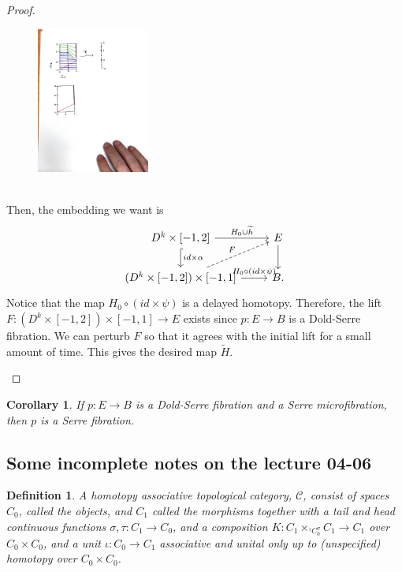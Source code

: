 \documentclass{article}
\newtheorem{corollary}[theorem]{Corollary}
\newtheorem{definition}[theorem]{Definition}
\newtheorem{proposed work}[theorem]{Proposed Work}
\begin{document}
\begin{proof}
\begin{itemize}
\begin{figure}[h]
\centering
\includegraphics[width=0.33\textwidth]{alphapic}
\end{figure}\\
Then, the embedding we want is
\begin{equation*}
\begin{tikzcd}
D^k \times [-1,2] \arrow[r, "H_0 \cup \widetilde{h}"] \arrow[d, hookrightarrow, "id \times \alpha"] & E \arrow[d] \\
(D^k \times [-1,2]) \times [-1,1] \arrow[r,"H_0 \circ(id \times \psi)"] \arrow[ur, dashed, "F"] & B.
\end{tikzcd}
\end{equation*}
Notice that the map $H_0 \circ(id \times \psi)$ is a delayed homotopy. Therefore, the lift $F: (D^k \times [-1,2]) \times [-1,1] \to E$ exists since $p: E \to B$ is a Dold-Serre fibration. We can perturb $F$ so that it agrees with the initial lift for a small amount of time. This gives the desired map $\widetilde{H}$. 
\end{itemize}
\end{proof}

\begin{corollary}
If $p: E \to B$ is a Dold-Serre fibration and a Serre microfibration, then $p$ is a Serre fibration.
\end{corollary}

\subsection{Some incomplete notes on the lecture 04-06}
\begin{definition}\label{HtpAssTopCat}
A homotopy associative topological category, $\mathcal{C}$, consist of spaces $C_0$, called the objects, and $C_1$ called the morphisms together with a tail and head continuous functions $\sigma, \tau : C_1\to C_0$, and a composition $K: C_1 \times_{{}^\tau C_0^\sigma} C_1\to C_1$ over $C_0\times C_0$, and a unit $\iota: C_0\to C_1$ associative and unital only up to (unspecified) homotopy over $C_0\times C_0$. 
\end{definition}
\end{document}
